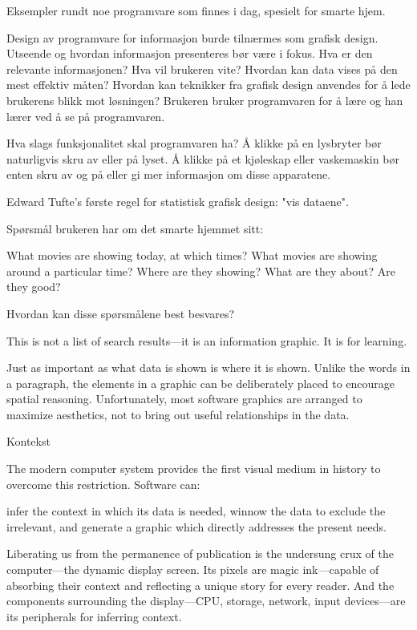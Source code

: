 {Eksempler rundt noe programvare som finnes i dag, spesielt for smarte hjem.

Design av programvare for informasjon burde tilnærmes som grafisk design. Utseende og hvordan informasjon presenteres bør være i fokus. Hva er den relevante informasjonen? Hva vil brukeren vite? Hvordan kan data vises på den mest effektiv måten? Hvordan kan teknikker fra grafisk design anvendes for å lede brukerens blikk mot løsningen? Brukeren bruker programvaren for å lære og han lærer ved å se på programvaren.

Hva slags funksjonalitet skal programvaren ha? Å klikke på en lysbryter bør naturligvis skru av eller på lyset. Å klikke på et kjøleskap eller vaskemaskin bør enten skru av og på eller gi mer informasjon om disse apparatene.

Edward Tufte's første regel for statistisk grafisk design: "vis dataene".

Spørsmål brukeren har om det smarte hjemmet sitt:

    What movies are showing today, at which times?
    What movies are showing around a particular time?
    Where are they showing?
    What are they about?
    Are they good?

Hvordan kan disse spørsmålene best besvares?

This is not a list of search results—it is an information graphic. It is for learning.

Just as important as what data is shown is where it is shown. Unlike the words in a paragraph, the elements in a graphic can be deliberately placed to encourage spatial reasoning. Unfortunately, most software graphics are arranged to maximize aesthetics, not to bring out useful relationships in the data.

Kontekst

The modern computer system provides the first visual medium in history to overcome this restriction. Software can:

    infer the context in which its data is needed,
    winnow the data to exclude the irrelevant, and
    generate a graphic which directly addresses the present needs.

Liberating us from the permanence of publication is the undersung crux of the computer—the dynamic display screen. Its pixels are magic ink—capable of absorbing their context and reflecting a unique story for every reader. And the components surrounding the display—CPU, storage, network, input devices—are its peripherals for inferring context.

}
